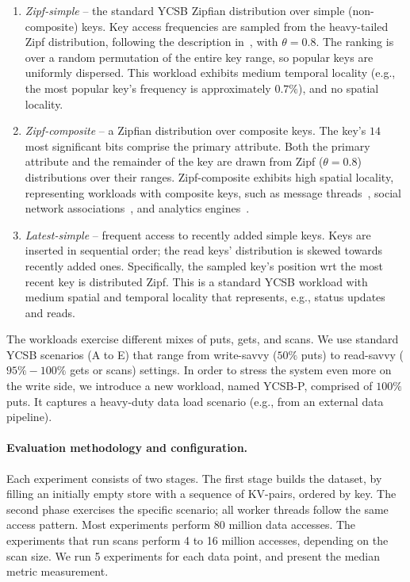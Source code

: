 \begin{enumerate}
\item {\em Zipf-simple} -- the standard YCSB Zipfian distribution over simple (non-composite) keys. 
Key access frequencies are sampled from the heavy-tailed Zipf distribution, 
following the description in~\cite{Gray:1994:QGB:191839.191886}, with $\theta = 0.8$. 
The ranking is over a random permutation of the entire key range, so popular keys are uniformly dispersed.
This workload exhibits 
medium temporal locality (e.g., the most popular key's frequency is approximately $0.7\%$), 
and no spatial locality. 

\item {\em Zipf-composite}  -- a Zipfian distribution over composite keys. 
The key's $14$ most significant bits comprise the primary attribute. Both the primary attribute and 
the remainder of the key are drawn from Zipf ($\theta=0.8$) distributions over their ranges. 
Zipf-composite exhibits high spatial locality, representing workloads 
with composite keys, such as message threads~\cite{Borthakur:2011:AHG:1989323.1989438},
social network associations~\cite{Armstrong:2013:LDB:2463676.2465296}, and analytics engines~\cite{flurry}. 

\item {\em Latest-simple} -- frequent access to recently added simple keys. 
Keys are inserted in sequential  order; the read keys' distribution is skewed towards recently added ones. 
Specifically, the sampled key's position wrt the most recent key is distributed Zipf. This is a 
standard YCSB workload with medium spatial and temporal locality that represents, e.g., status updates and reads. 

\end{enumerate}

The workloads exercise different mixes of puts, gets, and scans. We use standard YCSB scenarios 
(A to E) that range from write-savvy ($50\%$ puts) to read-savvy ($95\%-100\%$ gets or scans) settings. 
In order to stress the system even more on the write side, we introduce a new workload, named 
YCSB-P, comprised of $100\%$ puts. It captures a heavy-duty data load scenario (e.g., from an 
external data pipeline). 

\paragraph{Evaluation methodology and configuration.} Each experiment consists of two stages. The first stage builds 
the dataset, by filling an initially empty store with a sequence of KV-pairs, ordered by key. The second 
phase exercises the specific scenario; all worker threads follow the same access pattern. Most experiments 
perform 80 million data accesses. The experiments that run scans perform 4 to 16 million accesses, depending 
on the scan size. We run 5 experiments for each data point, and present the median metric measurement. 

